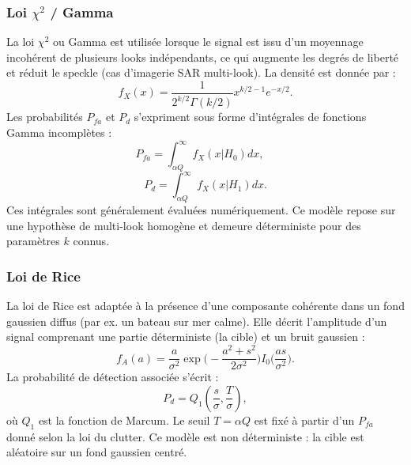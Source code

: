 \subsubsection{Loi $\chi^2$ / Gamma}

La loi $\chi^2$ ou Gamma est utilisée lorsque le signal est issu d’un moyennage incohérent de plusieurs looks indépendants, ce qui augmente les degrés de liberté et réduit le speckle (cas d’imagerie SAR multi-look).  
La densité est donnée par :
\begin{equation}
f_X(x)=\frac{1}{2^{k/2}\Gamma(k/2)}x^{k/2-1}e^{-x/2}.
\end{equation}
Les probabilités $P_{fa}$ et $P_d$ s’expriment sous forme d’intégrales de fonctions Gamma incomplètes \cite{richards2005, skolnik2001} :
\begin{equation}
P_{fa} = \int_{\alpha Q}^{\infty} f_X(x|H_0) dx, \quad
\end{equation}
\begin{equation}
P_d = \int_{\alpha Q}^{\infty} f_X(x|H_1) dx.
\end{equation}
Ces intégrales sont généralement évaluées numériquement.  
Ce modèle repose sur une hypothèse de multi-look homogène et demeure déterministe pour des paramètres $k$ connus.


\subsubsection{Loi de Rice}

La loi de Rice est adaptée à la présence d’une composante cohérente dans un fond gaussien diffus (par ex. un bateau sur mer calme).  
Elle décrit l’amplitude d’un signal comprenant une partie déterministe (la cible) et un bruit gaussien :
\begin{equation}
f_A(a)=\frac{a}{\sigma^2}\exp\!\Big(-\frac{a^2+s^2}{2\sigma^2}\Big)I_0\!\Big(\frac{a s}{\sigma^2}\Big).
\end{equation}
La probabilité de détection associée s’écrit \cite{skolnik2001, richards2005} :
\begin{equation}
P_d = Q_1\!\left(\frac{s}{\sigma},\frac{T}{\sigma}\right),
\end{equation}
où $Q_1$ est la fonction de Marcum.  
Le seuil $T = \alpha Q$ est fixé à partir d’un $P_{fa}$ donné selon la loi du clutter.  
Ce modèle est non déterministe : la cible est aléatoire sur un fond gaussien centré.

